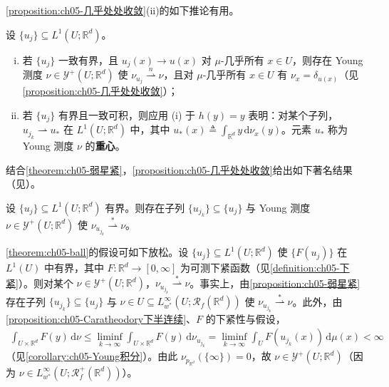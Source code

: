 \documentclass[../../main.tex]{subfiles}%
\begin{document}
\cref{proposition:ch05-几乎处处收敛}(ii)的如下推论有用。

\begin{remark}\label{remark:ch05-收敛注}
设 $\{u_j\}\subseteq L^1(U;\mathbb{R}^d)$。
\begin{enumerate}[(i)]
\item 若 $\{u_j\}$ 一致有界，且 $u_j(x)\to u(x)$ 对 $\mu$-几乎所有 $x\in U$，则存在 Young 测度 $\nu\in\mathcal{Y}^+(U;\mathbb{R}^d)$ 使 $\nu_{u_j}\stackrel{n}{\rightharpoonup}\nu$，且对 $\mu$-几乎所有 $x\in U$ 有 $\nu_x=\delta_{u(x)}$（见\cref{proposition:ch05-几乎处处收敛}）；
\item 若 $\{u_j\}$ 有界且一致可积，则应用 (i) 于 $h(y)=y$ 表明：对某个子列，$u_{j_k}\rightharpoonup u_*$ 在 $L^1(U;\mathbb{R}^d)$ 中，其中 $u_*(x)\triangleq \int_{\mathbb{R}^d}y\,\mathrm{d}\nu_x(y)$。元素 $u_*$ 称为 Young 测度 $\nu$ 的\textbf{重心}。
\end{enumerate}
\end{remark}

结合\cref{theorem:ch05-弱星紧}，\cref{proposition:ch05-几乎处处收敛}给出如下著名结果（见\cite[Theorem 2.1]{ref08}）。

\begin{theorem}[Ball]\label{theorem:ch05-ball}
设 $\{u_j\}\subseteq L^1(U;\mathbb{R}^d)$ 有界。则存在子列 $\{u_{j_k}\}\subseteq\{u_j\}$ 与 Young 测度 $\nu\in\mathcal{Y}^+(U;\mathbb{R}^d)$ 使 $\nu_{u_{j_k}}\stackrel{*}{\rightharpoonup}\nu$。
\end{theorem}

\begin{remark}\label{remark:ch05-ball注}
\cref{theorem:ch05-ball}的假设可如下放松。设 $\{u_j\}\subseteq L^1(U;\mathbb{R}^d)$ 使 $\{F(u_j)\}$ 在 $L^1(U)$ 中有界，其中 $F:\mathbb{R}^d\to[0,\infty]$ 为可测下紧函数（见\cref{definition:ch05-下紧}）。则对某个 $\nu\in\mathcal{Y}^+(U;\mathbb{R}^d)$，$\nu_{u_{j_k}}\stackrel{*}{\rightharpoonup}\nu$。事实上，由\cref{proposition:ch05-弱星紧}存在子列 $\{u_{j_k}\}\subseteq\{u_j\}$ 与 $\nu\in U\subseteq L^\infty_{w^*}(U;\mathscr{R}_f(\mathbb{R}^d))$ 使 $\nu_{u_{j_k}}\stackrel{*}{\rightharpoonup}\nu$。此外，由\cref{proposition:ch05-Caratheodory下半连续}、$F$ 的下紧性与假设，
\begin{align*}
\int_{U\times\mathbb{R}^d}F(y)\,\mathrm{d}\nu
\leqslant\liminf_{k\to\infty}\int_{U\times\mathbb{R}^d}F(y)\,\mathrm{d}\nu_{u_{j_k}}
=\liminf_{k\to\infty}\int_U F(u_{j_k}(x))\,\mathrm{d}\mu(x)<\infty
\end{align*}
（见\cref{corollary:ch05-Young积分}）。由此 $\nu_{p_{\mathbb{R}^d}}(\{\infty\})=0$，故 $\nu\in\mathcal{Y}^+(U;\mathbb{R}^d)$（因为 $\nu\in L^\infty_{w^*}(U;\mathscr{R}^+_f(\mathbb{R}^d))$）。
\end{remark}
\end{document}
